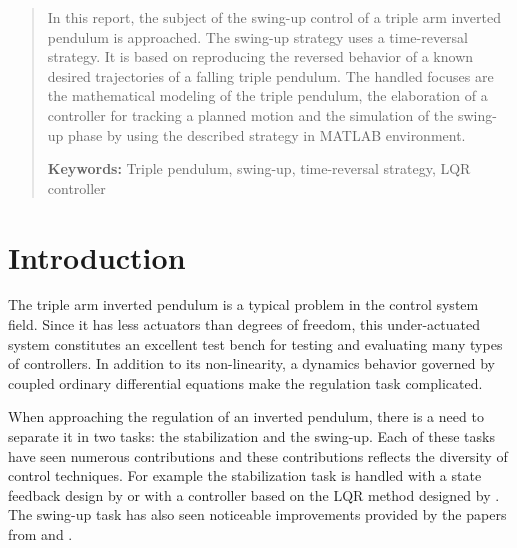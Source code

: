 \documentclass[a4paper,12pt]{article}
\begin{document}
\renewcommand{\headheight}{14.5pt}
\renewcommand{\tablename}{TABLE}
\renewcommand{\figurename}{FIGURE}

\hypersetup{pageanchor=false}


\hypersetup{pageanchor=true}
\newpage


\begin{abstract}
In this report, the subject of the swing-up control of a triple arm inverted pendulum is approached. The swing-up strategy uses a time-reversal strategy. It is based on reproducing the reversed behavior of a known desired trajectories of a falling triple pendulum. The handled focuses are the mathematical modeling of the triple pendulum, the elaboration of a controller for tracking a planned motion and the simulation of the swing-up phase by using the described strategy in MATLAB environment.

\noindent
\textbf{Keywords: }Triple pendulum, swing-up, time-reversal strategy, LQR controller
\end{abstract}
\newpage
\thispagestyle{empty}
\tableofcontents
\newpage




\section{Introduction}\label{sec:intro} %
The triple arm inverted pendulum is a typical problem in the control system field. Since it has less actuators than degrees of freedom, this under-actuated system constitutes an excellent test bench for testing and evaluating many types of controllers. In addition to its non-linearity, a dynamics behavior governed by coupled ordinary differential equations make the regulation task complicated.

When approaching the regulation of an inverted pendulum, there is a need to separate it in two tasks: the stabilization and the swing-up. Each of these tasks have seen numerous contributions and these contributions reflects the diversity of control techniques. For example the stabilization task is handled with a state feedback design by \citet{Medrano1997} or with a controller based on the LQR method designed by \citet{Gupta2014}. The swing-up task has also seen noticeable improvements provided by the papers from \citet{Astrom2000287} and \citet{Gluck2013801}.
\end{document}
